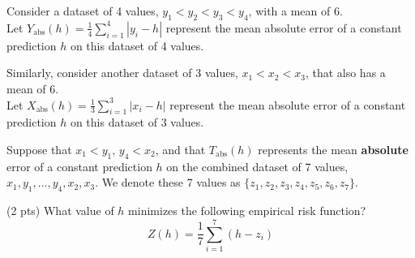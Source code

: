 \documentclass[twoside,12pt]{article}
\newcommand{\nishant}[1]{{\color{orange}[{\bf Nishant}: #1]}}
\newcommand{\suraj}[1]{{\color{blue}[{\bf Suraj}: #1]}}
\begin{document}
\begin{probset}

\newpage

\begin{prob}

    
    Consider a dataset of 4 values, $y_1 < y_2 < y_3 < y_4$, with a mean of 6. \\ Let $Y_\text{abs}(h) = \frac{1}{4} \sum_{i = 1}^4 |y_i - h|$ represent the mean absolute error of a constant prediction $h$ on this dataset of 4 values.

    Similarly, consider another dataset of 3 values, $x_1 < x_2 < x_3$, that also has a mean of 6. \\ Let $X_\text{abs}(h) = \frac{1}{3} \sum_{i = 1}^3 |x_i - h|$ represent the mean absolute error of a constant prediction $h$ on this dataset of 3 values.

    Suppose that $x_1 < y_1$, $y_4 < x_2$, and that $T_\text{abs}(h)$ represents the mean \textbf{absolute} error of a constant prediction $h$ on the combined dataset of 7 values, $x_1, y_1, ..., y_4, x_2, x_3$. We denote these 7 values as $\{ z_1, z_2, z_3, z_4, z_5, z_6, z_7 \}$.


    \begin{subprobset}
        \begin{subprob}(2 pts)
            What value of $h$ minimizes the following empirical risk function? $$Z(h) = \frac{1}{7} \sum_{i = 1}^7 (h - z_i)$$

            
            \correctbubble{$-\infty$}
            
            
            

\end{subprob}
\end{subprobset}
\end{prob}
\end{probset}
\end{document}
